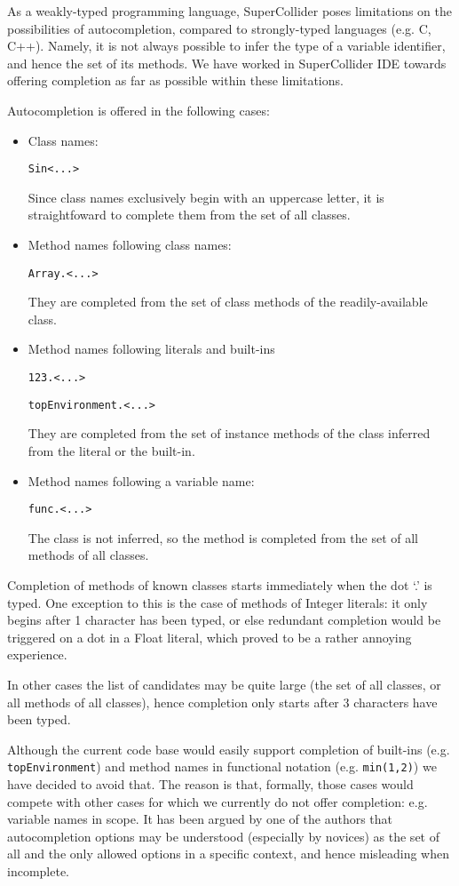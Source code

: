 \documentclass[11pt,a4paper]{article}
\begin{document}
As a weakly-typed programming language, SuperCollider poses limitations on the possibilities of
autocompletion, compared to strongly-typed languages (e.g. C, C++). Namely, it is not always
possible to infer the type of a variable identifier, and hence the set of its methods. We have
worked in SuperCollider IDE towards offering completion as far as possible within these limitations.

Autocompletion is offered in the following cases:
\begin{itemize}
 \item Class names:

 \verb|Sin<...>|

 Since class names exclusively begin with an uppercase letter, it is straightfoward
 to complete them from the set of all classes.

 \item Method names following class names:

 \verb|Array.<...>|

 They are completed from the set of class methods of the
 readily-available class.

 \item Method names following literals and built-ins

 \verb|123.<...>|

 \verb|topEnvironment.<...>|

 They are completed from the set of instance methods of the class
 inferred from the literal or the built-in.

 \item Method names following a variable name:

 \verb|func.<...>|

 The class is not inferred, so the method is completed from the set of all methods of all classes.

\end{itemize}

Completion of methods of known classes starts immediately when the dot `.' is typed. One exception
to this is the case of methods of Integer literals: it only begins after 1 character has been
typed, or else redundant completion would be triggered on a dot in a Float literal, which proved
to be a rather annoying experience.

In other cases the list of candidates may be quite large (the set of all classes, or all methods of
all classes), hence completion only starts after 3 characters have been typed.

Although the current code base would easily support completion of built-ins (e.g.
\verb|topEnvironment|) and method names in functional notation (e.g. \verb|min(1,2)|) we have
decided to avoid that. The reason is that, formally, those cases would compete with other cases for
which we currently do not offer completion: e.g. variable names in scope. It has been argued by
one of the authors that autocompletion options may be understood (especially by novices) as the set
of all and the only allowed options in a specific context, and hence misleading when incomplete.
\end{document}
